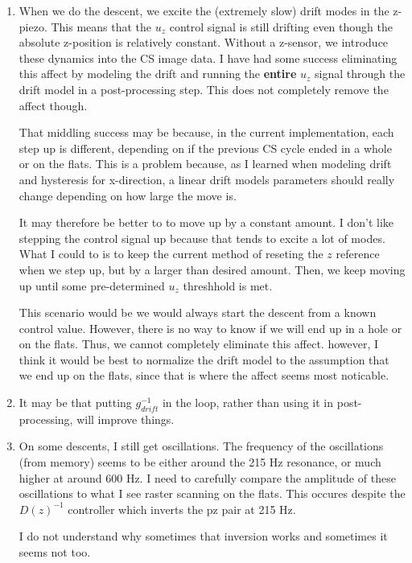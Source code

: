 \documentclass[11pt]{article}
\begin{document}
\begin{enumerate}
\item When we do the descent, we excite the (extremely slow) drift modes in the z-piezo. This means that the \(u_{z}\) control signal is still drifting even though the absolute z-position is relatively constant. Without a z-sensor, we introduce these dynamics into the CS image data. I have had some success eliminating this affect by modeling the drift and running the \textbf{entire} \(u_{z}\) signal through the drift model in a post-processing step. This does not completely remove the affect though. 

That middling success may be because, in the current implementation, each step up is different, depending on if the previous CS cycle ended in a whole or on the flats. This is a problem because, as I learned when modeling drift and hysteresis for x-direction, a linear drift models parameters should really change depending on how large the move is.

It may therefore be better to to move up by a constant amount. I don't like stepping the control signal up because that tends to excite a lot of modes. What I could to is to keep the current method of reseting the \(z\) reference when we step up, but by a larger than desired amount. Then, we keep moving up until some pre-determined \(u_{z}\) threshhold is met.

This scenario would be we would always start the descent from a known control value. However, there is no way to know if we will end up in a hole or on the flats. Thus, we cannot completely eliminate this affect. however, I think it would be best to normalize the drift model to the assumption that we end up on the flats, since that is where the affect seems most noticable.

\item It may be that putting \(g_{drift}^{-1}\) in the loop, rather than using it in post-processing, will improve things.

\item On some descents, I still get oscillations. The frequency of the oscillations (from memory) seems to be either around the 215 Hz resonance, or much higher at around 600 Hz. I need to carefully compare the amplitude of these oscillations to what I see raster scanning on the flats. This occures despite the \(D(z)^{-1}\) controller  which inverts the pz pair at 215 Hz. 

I do not understand why sometimes that inversion works and sometimes it seems not too.


\end{enumerate}
\end{document}
